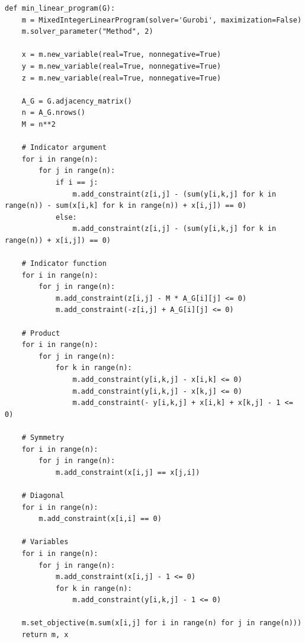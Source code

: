\begin{lstlisting}[style=python, caption={Min Linear Program.}, label={lst::min_linear_program}]
def min_linear_program(G):
    m = MixedIntegerLinearProgram(solver='Gurobi', maximization=False)
    m.solver_parameter("Method", 2)

    x = m.new_variable(real=True, nonnegative=True)
    y = m.new_variable(real=True, nonnegative=True)
    z = m.new_variable(real=True, nonnegative=True)

    A_G = G.adjacency_matrix()
    n = A_G.nrows()
    M = n**2

    # Indicator argument
    for i in range(n):
        for j in range(n):
            if i == j:
                m.add_constraint(z[i,j] - (sum(y[i,k,j] for k in range(n)) - sum(x[i,k] for k in range(n)) + x[i,j]) == 0)
            else:
                m.add_constraint(z[i,j] - (sum(y[i,k,j] for k in range(n)) + x[i,j]) == 0)

    # Indicator function
    for i in range(n):
        for j in range(n):
            m.add_constraint(z[i,j] - M * A_G[i][j] <= 0)
            m.add_constraint(-z[i,j] + A_G[i][j] <= 0)

    # Product
    for i in range(n):
        for j in range(n):
            for k in range(n):
                m.add_constraint(y[i,k,j] - x[i,k] <= 0)
                m.add_constraint(y[i,k,j] - x[k,j] <= 0)
                m.add_constraint(- y[i,k,j] + x[i,k] + x[k,j] - 1 <= 0)

    # Symmetry
    for i in range(n):
        for j in range(n):
            m.add_constraint(x[i,j] == x[j,i])

    # Diagonal
    for i in range(n):
        m.add_constraint(x[i,i] == 0)

    # Variables
    for i in range(n):
        for j in range(n):
            m.add_constraint(x[i,j] - 1 <= 0)
            for k in range(n):
                m.add_constraint(y[i,k,j] - 1 <= 0)

    m.set_objective(m.sum(x[i,j] for i in range(n) for j in range(n)))
    return m, x
\end{lstlisting}

